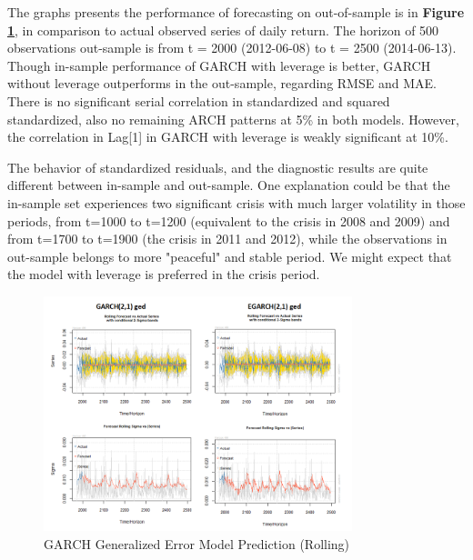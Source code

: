 \documentclass[a4paper]{article}
\begin{document}
The graphs presents the performance of forecasting on out-of-sample is in \textbf{Figure \ref{fig:pred_ged}}, in comparison to actual observed series of daily return. The horizon of 500 observations out-sample is from t = 2000 (2012-06-08) to t = 2500 (2014-06-13). \\

Though in-sample performance of GARCH with leverage is better, GARCH without leverage outperforms in the out-sample, regarding RMSE and MAE. There is no significant serial correlation in standardized and squared standardized, also no remaining ARCH patterns at 5\% in both models. However, the correlation in Lag[1] in GARCH with leverage is weakly significant at 10\%. 

The behavior of standardized residuals, and the diagnostic results are quite different between in-sample and out-sample. One explanation could be that the in-sample set experiences two significant crisis with much larger volatility in those periods, from t=1000 to t=1200 (equivalent to the crisis in 2008 and 2009) and from t=1700 to t=1900 (the crisis in 2011 and 2012), while the observations in out-sample belongs to more "peaceful" and stable period. We might expect that the model with leverage is preferred in the crisis period.\\

\begin{figure}[H]
\centering
\includegraphics[width=0.8\textwidth]{forecast_ged.png}
\caption{\label{fig:pred_ged}GARCH Generalized Error Model Prediction (Rolling)}
\end{figure}
\end{document}
